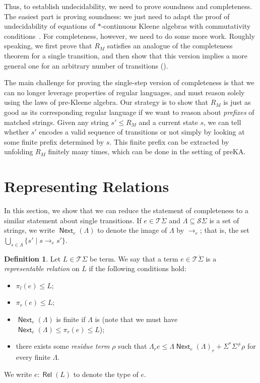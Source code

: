 \documentclass[11pt,a4paper]{amsart}
\theoremstyle{definition}
\newtheorem{definition}[theorem]{Definition}
\DeclareMathOperator{\Next}{\mathsf{Next}}
\DeclareMathOperator{\Rel}{\mathsf{Rel}}
\begin{document}
Thus, to establish undecidability, we need to prove soundness and completeness.
The easiest part is proving soundness: we just need to adapt the proof of
undecidability of equations of $*$-continuous Kleene algebras with commutativity
conditions~\cite{Kozen_1996}.
%
For completeness, however, we need to do some more work. Roughly speaking, we
first prove that $R_M$ satisfies an analogue of the completeness theorem for a
single transition, and then show that this version implies a more general one
for an arbitrary number of transitions ().

The main challenge for proving the single-step version of completeness is that
we can no longer leverage properties of regular languages, and must reason
solely using the laws of pre-Kleene algebra.  Our strategy is to show that $R_M$
is just as good as its corresponding regular language if we want to reason about
\emph{prefixes} of matched strings.  Given any string $s' \leq R_M$ and a
current state $s$, we can tell whether $s'$ encodes a valid sequence of
transitions or not simply by looking at some finite prefix determined by $s$.
This finite prefix can be extracted by unfolding $R_M$ finitely many times,
which can be done in the setting of preKA.

\section{Representing Relations}
\label{sec:relations}

In this section, we show that we can reduce the statement of completeness to a
similar statement about single transitions.  If $e  \in  \mathcal{T}\ddot{ \Sigma }$ and
$ \Lambda   \subseteq  \mathcal{S} \Sigma $ is a set of strings, we write $\Next_e( \Lambda )$ to denote the
image of $ \Lambda $ by $ \to _e$; that is, the set $ \bigcup _{s  \in   \Lambda } \{ s'  \mid  s  \to _e s' \}$.

\begin{definition}
  \label{def:representable-relation}
  Let $L  \in  \mathcal{T} \Sigma $ be term.  We say that a term $e  \in  \mathcal{T}\ddot{ \Sigma }$
  is a \emph{representable relation} on $L$ if the following conditions hold:
  \begin{itemize}
  \item $ \pi _l(e)  \leq  L$;
  \item $ \pi _r(e)  \leq  L$;
  \item $\Next_e( \Lambda )$ is finite if $ \Lambda $ is (note that we must have
    $\Next_e( \Lambda )  \leq   \pi _r(e)  \leq  L$);
  \item there exists some \emph{residue term} $ \rho $ such that
    $ \Lambda _re  \leq   \Lambda \Next_e( \Lambda )_r +  \Sigma ^* \Sigma ^{ \neq } \rho $ for every finite $ \Lambda $.
  \end{itemize}
  We write $e : \Rel(L)$ to denote the type of $e$.
\end{definition}
\end{document}
